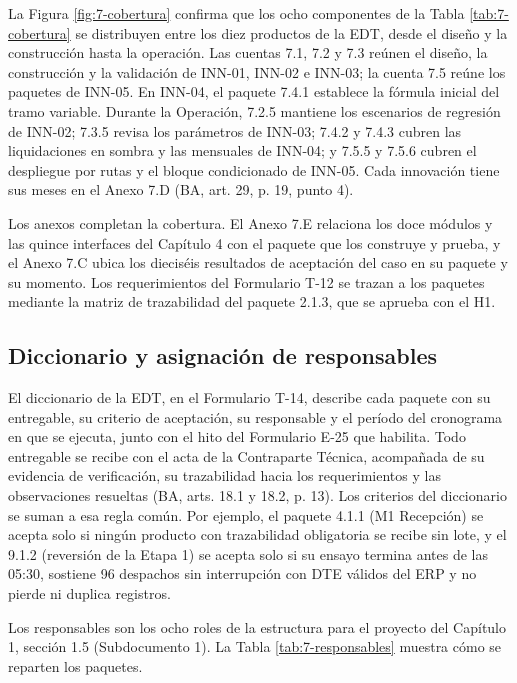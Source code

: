 La Figura \ref{fig:7-cobertura} confirma que los ocho componentes de la Tabla \ref{tab:7-cobertura} se distribuyen entre los diez productos de la EDT, desde el diseño y la construcción hasta la operación. Las cuentas 7.1, 7.2 y 7.3 reúnen el diseño, la construcción y la validación de INN-01, INN-02 e INN-03; la cuenta 7.5 reúne los paquetes de INN-05. En INN-04, el paquete 7.4.1 establece la fórmula inicial del tramo variable. Durante la Operación, 7.2.5 mantiene los escenarios de regresión de INN-02; 7.3.5 revisa los parámetros de INN-03; 7.4.2 y 7.4.3 cubren las liquidaciones en sombra y las mensuales de INN-04; y 7.5.5 y 7.5.6 cubren el despliegue por rutas y el bloque condicionado de INN-05. Cada innovación tiene sus meses en el Anexo 7.D (BA, art. 29, p. 19, punto 4).

Los anexos completan la cobertura. El Anexo 7.E relaciona los doce módulos y las quince interfaces del Capítulo 4 con el paquete que los construye y prueba, y el Anexo 7.C ubica los dieciséis resultados de aceptación del caso en su paquete y su momento. Los requerimientos del Formulario T-12 se trazan a los paquetes mediante la matriz de trazabilidad del paquete 2.1.3, que se aprueba con el H1.

\subsection{Diccionario y asignación de responsables}

El diccionario de la EDT, en el Formulario T-14, describe cada paquete con su entregable, su criterio de aceptación, su responsable y el período del cronograma en que se ejecuta, junto con el hito del Formulario E-25 que habilita. Todo entregable se recibe con el acta de la Contraparte Técnica, acompañada de su evidencia de verificación, su trazabilidad hacia los requerimientos y las observaciones resueltas (BA, arts. 18.1 y 18.2, p. 13). Los criterios del diccionario se suman a esa regla común. Por ejemplo, el paquete 4.1.1 (M1 Recepción) se acepta solo si ningún producto con trazabilidad obligatoria se recibe sin lote, y el 9.1.2 (reversión de la Etapa 1) se acepta solo si su ensayo termina antes de las 05:30, sostiene 96 despachos sin interrupción con DTE válidos del ERP y no pierde ni duplica registros.

Los responsables son los ocho roles de la estructura para el proyecto del Capítulo 1, sección 1.5 (Subdocumento 1). La Tabla \ref{tab:7-responsables} muestra cómo se reparten los paquetes.

